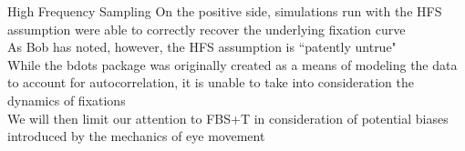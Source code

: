 \documentclass{beamer}
\begin{document}
\begin{frame}{High Frequency Sampling}
On the positive side, simulations run with the HFS assumption were able to correctly recover the underlying fixation curve \newline \\

As Bob has noted, however, the HFS assumption is ``patently untrue" \newline \\

While the bdots package was originally created as a means of modeling the data to account for autocorrelation, it is unable to take into consideration the dynamics of fixations \newline \\

We will then limit our attention to FBS+T in consideration of potential biases introduced by the mechanics of eye movement


\end{frame}
\end{document}
